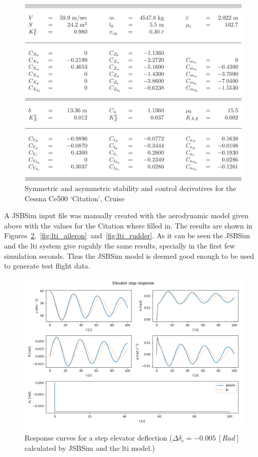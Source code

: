 \begin{figure}
\centering
\includegraphics[width=14cm]{figures/tablecoefs.png}
\caption{Symmetric and asymmetric stability and control derivatives for the Cessna Ce500 ‘Citation’, Cruise}
\label{fig:coeftable}
\end{figure}


A JSBSim input file was manually created with the aerodynamic model given above with the values for the Citation where filled in. The results are shown in Figures~\ref{fig:lti_elevator},~\ref{fig:lti_aileron}~and~\ref{fig:lti_rudder}. As it can be seen the JSBSim and the \gls{lti} system give roguhly the same results, specially in the first few simulation seconds. Thus the JSBSim model is deemed good enough to be used to generate test flight data.


\begin{figure}
\centering
\includegraphics[width=14cm]{figures/lti_elevator}
\caption{Response curves for a step elevator deflection ($\Delta\delta_e=-0.005\ [Rad]$ calculated by JSBSim and the \gls{lti} model.)}
\label{fig:lti_elevator}
\end{figure}

